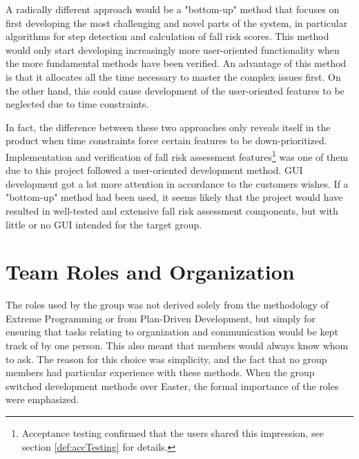 A radically different approach would be a "bottom-up" method that focuses on first developing the most challenging and novel parts of the system, in particular algorithms for step detection and calculation of fall risk scores. This method would only start developing increasingly more user-oriented functionality when the more fundamental methods have been verified. An advantage of this method is that it allocates all the time necessary to master the complex issues first. On the other hand, this could cause development of the user-oriented features to be neglected due to time constraints. 

In fact, the difference between these two approaches only reveals itself in the product when time constraints force certain features to be down-prioritized. Implementation and verification of fall risk assessment features\footnote{Acceptance testing confirmed that the users shared this impression, see section \ref{def:accTesting} for details.} was one of them due to this project followed a user-oriented development method. GUI development got a lot more attention in accordance to the customers wishes. If a "bottom-up" method had been used, it seems likely that the project would have resulted in well-tested and extensive fall risk assessment components, but with little or no GUI intended for the target group. 

\section{Team Roles and Organization}
The roles used by the group was not derived solely from the methodology of Extreme Programming or from Plan-Driven Development, but simply for ensuring that tasks relating to organization and communication would be kept track of by one person. This also meant that members would always know whom to ask. The reason for this choice was simplicity, and the fact that no group members had particular experience with these methods. When the group switched development methods over Easter, the formal importance of the roles were emphasized.

